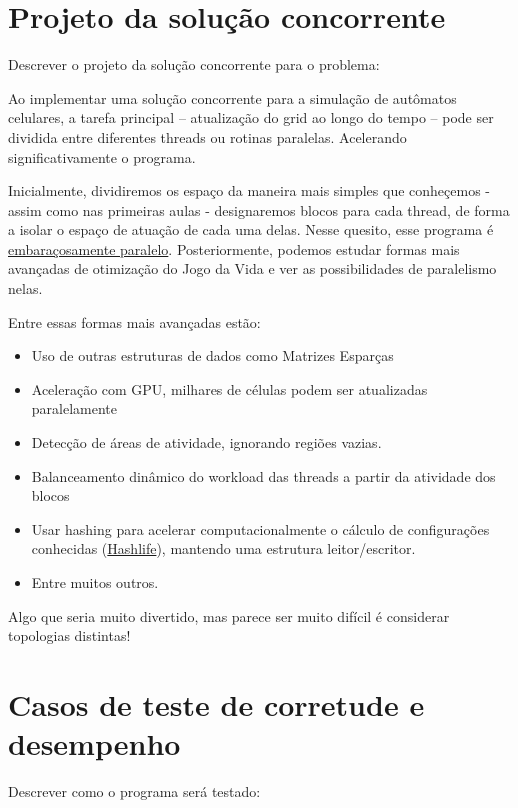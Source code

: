 \documentclass[14]{article}
\begin{document}
\section{Projeto da solução concorrente}
{Descrever o projeto da solução concorrente para o problema: 

Ao implementar uma solução concorrente para a simulação de autômatos celulares, a tarefa principal – 
atualização do grid ao longo do tempo – pode ser dividida entre diferentes threads ou rotinas paralelas.
Acelerando significativamente o programa.

Inicialmente, dividiremos os espaço da maneira mais simples que conheçemos - assim como nas primeiras aulas - designaremos
blocos para cada thread, de forma a isolar o espaço de atuação de cada uma delas. Nesse quesito, esse programa é 
\href{https://en.wikipedia.org/wiki/Embarrassingly_parallel}{embaraçosamente paralelo}.
Posteriormente, podemos estudar formas mais avançadas de otimização do Jogo da Vida e ver as possibilidades de paralelismo nelas.

Entre essas formas mais avançadas estão:
\begin{itemize}
    \item Uso de outras estruturas de dados como Matrizes Esparças
    \item Aceleração com GPU, milhares de células podem ser atualizadas paralelamente
    \item Detecção de áreas de atividade, ignorando regiões vazias.
    \item Balanceamento dinâmico do workload das threads a partir da atividade dos blocos
    \item Usar hashing para acelerar computacionalmente o cálculo de configurações conhecidas (\href{https://en.wikipedia.org/wiki/Hashlife}{Hashlife}), mantendo
    uma estrutura leitor/escritor.
    \item Entre muitos outros.
\end{itemize}

Algo que seria muito divertido, mas parece ser muito difícil é considerar topologias distintas!

\section{Casos de teste de corretude e desempenho}
{Descrever como o programa será testado:

}}
\end{document}
